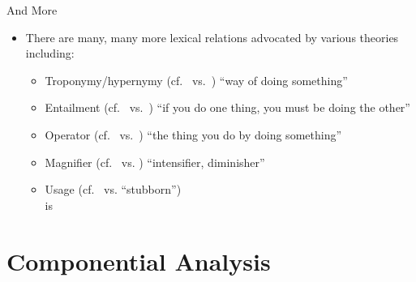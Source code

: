 \documentclass{beamer}
\begin{document}
\begin{frame}{And More}
\MyLogo{}
\begin{itemize}
\item There are many, many more lexical relations advocated by various
  theories including:
  \begin{itemize}
  \item Troponymy/hypernymy (cf.\  vs.\ ) 
    ``way of doing something''
  \item Entailment (cf.\  vs.\ ) ``if you do one thing, you must be doing the other''
  \item Operator (cf.\  vs.\ )
    ``the thing you do by doing something''
  \item Magnifier (cf.\  vs. )
    ``intensifier, diminisher''
  \item Usage (cf.\  vs.  ``stubborn'')
    \\  is 
  \end{itemize}
\end{itemize}

\end{frame}
\section{Componential Analysis}
\end{document}
